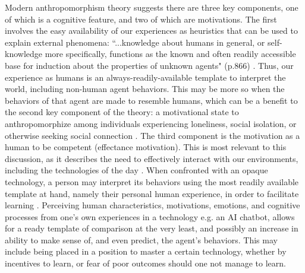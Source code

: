 \documentclass{article}
\theoremstyle{plain}
\theoremstyle{definition}
\theoremstyle{remark}
\begin{document}
Modern anthropomorphism theory
suggests there are three key components, one of which is a cognitive feature, and two of which are motivations. The first involves the easy availability of our experiences as heuristics that can be used to explain external phenomena: ``...knowledge about humans in general, or self-knowledge more specifically, functions as the known and often readily accessible base for induction about the properties of unknown agents" (p.866) \cite{epley2007seeing, waytz2010social}. Thus, our experience as humans is an always-readily-available template to interpret the world, including non-human agent behaviors. This may be more so when the behaviors of that agent are made to resemble humans, which can be a benefit to the second key component of the theory: a motivational state to anthropomorphize among individuals experiencing loneliness, social isolation, or otherwise seeking social connection \cite{epley2007seeing, waytz2010social}. 
The third component is the motivation as a human to be competent (effectance motivation). This is most relevant to this discussion, as it describes the need to effectively interact with our environments, including the technologies of the day \cite{epley2007seeing}. When confronted with an opaque technology, a person may interpret its behaviors using the most readily available template at hand, namely their personal human experience, in order to facilitate learning \cite{epley2007seeing, waytz2010social}. Perceiving human characteristics, motivations, emotions, and cognitive processes from one's own experiences in a technology e.g. an AI chatbot, allows for a ready template of comparison at the very least, and possibly an increase in ability to make sense of, and even predict, the agent's behaviors. This may include being placed in a position to master a certain technology, whether by incentives to learn, or fear of poor outcomes should one not manage to learn. 
\end{document}
